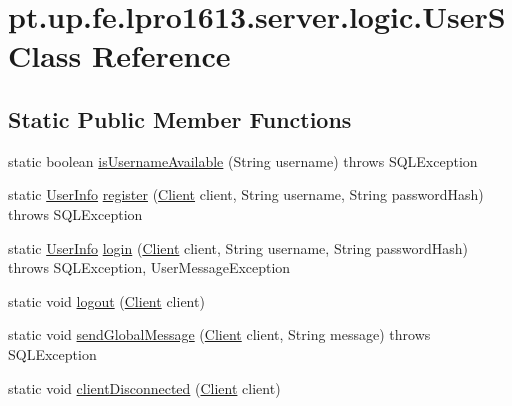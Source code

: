 \hypertarget{classpt_1_1up_1_1fe_1_1lpro1613_1_1server_1_1logic_1_1_user_s}{}\section{pt.\+up.\+fe.\+lpro1613.\+server.\+logic.\+UserS Class Reference}
\label{classpt_1_1up_1_1fe_1_1lpro1613_1_1server_1_1logic_1_1_user_s}
\subsection*{Static Public Member Functions}
\begin{DoxyCompactItemize}
\item 
static boolean \hyperlink{classpt_1_1up_1_1fe_1_1lpro1613_1_1server_1_1logic_1_1_user_s_a9c89c0a0ef730b38021033e58f7911cd}{is\+Username\+Available} (String username)  throws S\+Q\+L\+Exception 
\item 
static \hyperlink{classpt_1_1up_1_1fe_1_1lpro1613_1_1sharedlib_1_1tuples_1_1_user_info}{User\+Info} \hyperlink{classpt_1_1up_1_1fe_1_1lpro1613_1_1server_1_1logic_1_1_user_s_ae46d3839ba68eb377aff71f23e3b3936}{register} (\hyperlink{classpt_1_1up_1_1fe_1_1lpro1613_1_1server_1_1conn_1_1_client}{Client} client, String username, String password\+Hash)  throws S\+Q\+L\+Exception 
\item 
static \hyperlink{classpt_1_1up_1_1fe_1_1lpro1613_1_1sharedlib_1_1tuples_1_1_user_info}{User\+Info} \hyperlink{classpt_1_1up_1_1fe_1_1lpro1613_1_1server_1_1logic_1_1_user_s_a501230613cfd4f8fee1949c3f116f0ac}{login} (\hyperlink{classpt_1_1up_1_1fe_1_1lpro1613_1_1server_1_1conn_1_1_client}{Client} client, String username, String password\+Hash)  throws S\+Q\+L\+Exception, User\+Message\+Exception 
\item 
static void \hyperlink{classpt_1_1up_1_1fe_1_1lpro1613_1_1server_1_1logic_1_1_user_s_ade6f87a4adfd727f4fceca4f9ac17362}{logout} (\hyperlink{classpt_1_1up_1_1fe_1_1lpro1613_1_1server_1_1conn_1_1_client}{Client} client)
\item 
static void \hyperlink{classpt_1_1up_1_1fe_1_1lpro1613_1_1server_1_1logic_1_1_user_s_af6142b2b17e9ff980cb39481dfd98a26}{send\+Global\+Message} (\hyperlink{classpt_1_1up_1_1fe_1_1lpro1613_1_1server_1_1conn_1_1_client}{Client} client, String message)  throws S\+Q\+L\+Exception 
\item 
static void \hyperlink{classpt_1_1up_1_1fe_1_1lpro1613_1_1server_1_1logic_1_1_user_s_afca9c18f164a1006c2411b8e283ec4fb}{client\+Disconnected} (\hyperlink{classpt_1_1up_1_1fe_1_1lpro1613_1_1server_1_1conn_1_1_client}{Client} client)

\end{DoxyCompactItemize}
